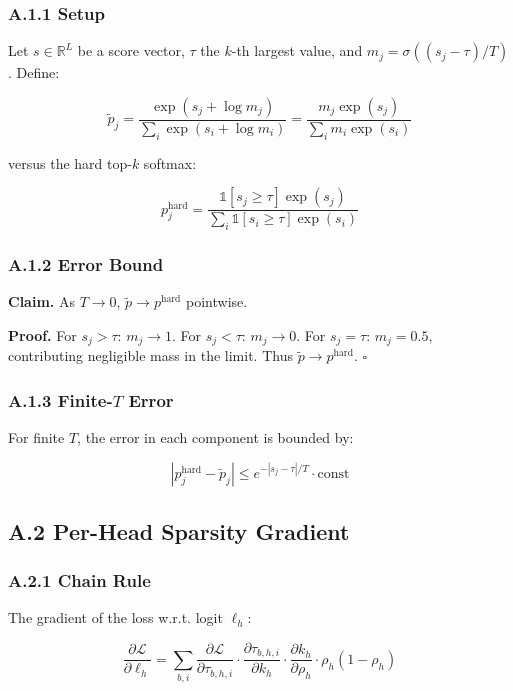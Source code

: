 \subsubsection{A.1.1 Setup}

Let $s \in \mathbb{R}^L$ be a score vector, $\tau$ the $k$-th largest 
value, and $m_j = \sigma((s_j - \tau) / T)$. Define:

\[
\tilde{p}_j = \frac{\exp(s_j + \log m_j)}{\sum_i \exp(s_i + \log m_i)} = \frac{m_j \exp(s_j)}{\sum_i m_i \exp(s_i)}
\]

versus the hard top-$k$ softmax:

\[
p_j^{\text{hard}} = \frac{\mathbb{1}[s_j \ge \tau] \exp(s_j)}{\sum_i \mathbb{1}[s_i \ge \tau] \exp(s_i)}
\]

\subsubsection{A.1.2 Error Bound}

\textbf{Claim.} As $T \to 0$, $\tilde{p} \to p^{\text{hard}}$ pointwise.

\textbf{Proof.} For $s_j > \tau$: $m_j \to 1$. For $s_j < \tau$: $m_j \to 0$. 
For $s_j = \tau$: $m_j = 0.5$, contributing negligible mass in the limit. 
Thus $\tilde{p} \to p^{\text{hard}}$. $\square$

\subsubsection{A.1.3 Finite-$T$ Error}

For finite $T$, the error in each component is bounded by:

\[
|p_j^{\text{hard}} - \tilde{p}_j| \leq e^{-|s_j - \tau| / T} \cdot \text{const}
\]

\subsection{A.2 Per-Head Sparsity Gradient}

\subsubsection{A.2.1 Chain Rule}

The gradient of the loss w.r.t. logit $\ell_h$:

\[
\frac{\partial \mathcal{L}}{\partial \ell_h} = \sum_{b, i} \frac{\partial \mathcal{L}}{\partial \tau_{b, h, i}} \cdot \frac{\partial \tau_{b, h, i}}{\partial k_h} \cdot \frac{\partial k_h}{\partial \rho_h} \cdot \rho_h (1 - \rho_h)
\]

